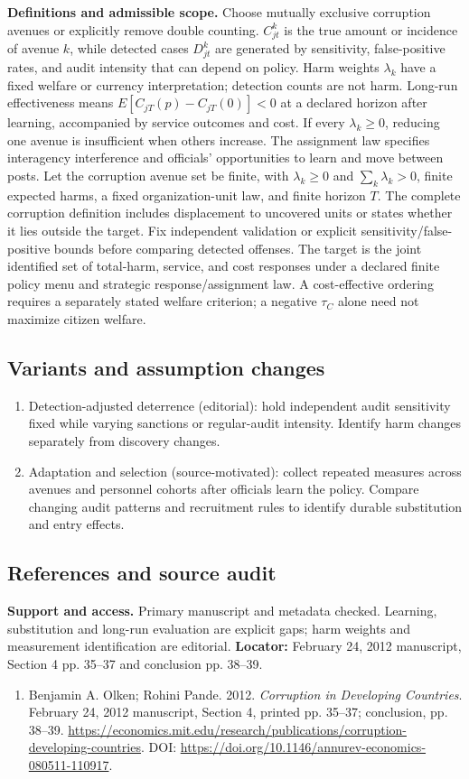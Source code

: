 \documentclass[11pt,a4paper]{article}
\begin{document}
\textbf{Definitions and admissible scope.} Choose mutually exclusive corruption avenues or explicitly remove double counting. \(C^k_{jt}\) is the true amount or incidence of avenue \(k\), while detected cases \(D^k_{jt}\) are generated by sensitivity, false-positive rates, and audit intensity that can depend on policy. Harm weights \(\lambda_k\) have a fixed welfare or currency interpretation; detection counts are not harm. Long-run effectiveness means \(E[C_{jT}(p)-C_{jT}(0)]<0\) at a declared horizon after learning, accompanied by service outcomes and cost. If every \(\lambda_k\ge0\), reducing one avenue is insufficient when others increase. The assignment law specifies interagency interference and officials' opportunities to learn and move between posts. Let the corruption avenue set be finite, with \(\lambda_k\ge0\) and \(\sum_k\lambda_k>0\), finite expected harms, a fixed organization-unit law, and finite horizon \(T\). The complete corruption definition includes displacement to uncovered units or states whether it lies outside the target. Fix independent validation or explicit sensitivity/false-positive bounds before comparing detected offenses. The target is the joint identified set of total-harm, service, and cost responses under a declared finite policy menu and strategic response/assignment law. A cost-effective ordering requires a separately stated welfare criterion; a negative \(\tau_C\) alone need not maximize citizen welfare.
\subsection*{Variants and assumption changes}
\begin{enumerate}
\item Detection-adjusted deterrence (editorial): hold independent audit sensitivity fixed while varying sanctions or regular-audit intensity. Identify harm changes separately from discovery changes.
\item Adaptation and selection (source-motivated): collect repeated measures across avenues and personnel cohorts after officials learn the policy. Compare changing audit patterns and recruitment rules to identify durable substitution and entry effects.
\end{enumerate}
\subsection*{References and source audit}
\textbf{Support and access.} Primary manuscript and metadata checked. Learning, substitution and long-run evaluation are explicit gaps; harm weights and measurement identification are editorial. \textbf{Locator:} February 24, 2012 manuscript, Section 4 pp. 35--37 and conclusion pp. 38--39.
\begin{enumerate}\raggedright
\item\hypertarget{definitions:source:30007665:1}{} Benjamin A. Olken; Rohini Pande. 2012. \emph{Corruption in Developing Countries}. February 24, 2012 manuscript, Section 4, printed pp. 35--37; conclusion, pp. 38--39.
\url{https://economics.mit.edu/research/publications/corruption-developing-countries}.
DOI: \url{https://doi.org/10.1146/annurev-economics-080511-110917}.
\end{enumerate}
\end{document}
